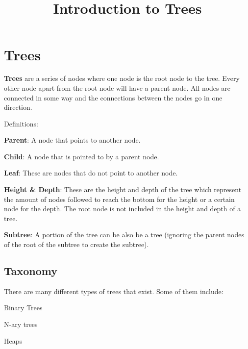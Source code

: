\documentclass[11pt,a4paper,english]{article}
\begin{document}
\title{Introduction to Trees}
\maketitle

\tableofcontents
\section{Trees}

\textbf{Trees} are a series of nodes where one node is the root node to the tree. Every other node apart from the root node will have a parent node. All nodes are connected in some way and the connections between the nodes go in one direction.

\bigskip
\begin{bluebox}{Definitions:}{

  \begin{itemize} {

      \item \textbf{Parent}: A node that points to another node.
      \item \textbf{Child}: A node that is pointed to by a parent node.
      \item \textbf{Leaf}: These are nodes that do not point to another node.
      \item \textbf{Height \& Depth}: These are the height and depth of the tree which represent the amount of nodes followed to reach the bottom for the height or a certain node for the depth. The root node is not included in the height and depth of a tree.
      \item \textbf{Subtree}: A portion of the tree can be also be a tree (ignoring the parent nodes of the root of the subtree to create the subtree).

  }\end{itemize}

}\end{bluebox}

\bigskip

\subsection{Taxonomy}

There are many different types of trees that exist. Some of them include:
\begin{itemize} {

    \item Binary Trees
    \item N-ary trees
    \item Heaps

}\end{itemize}
\end{document}

